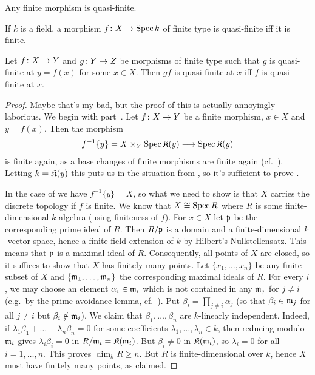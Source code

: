 \documentclass[a4paper,parskip=half,numbers=enddot, DIV=12]{scrreprt}
\renewcommand{\geq}{\geqslant}
\begin{document}
\begin{fact}
	\begin{alphanumerate}
		\item {}Any finite morphism is quasi-finite.
		\item If $k$ is a field, a morphism $f\colon X\morphism\Spec k$ of finite type is quasi-finite iff it is finite.
		\item Let $f\colon X\morphism Y$ and $g\colon Y\morphism Z$ be morphisms of finite type such that $g$ is quasi-finite at $y=f(x)$ for some $x\in X$. Then $gf$ is quasi-finite at $x$ iff $f$ is quasi-finite at $x$.
	\end{alphanumerate}
\end{fact}
\begin{proof}
	Maybe that's my bad, but the proof of this is actually annoyingly laborious. We begin with part~. Let $f\colon X\morphism Y$ be a finite morphism, $x\in X$ and $y=f(x)$. Then the morphism
	\begin{align*}
		f^{-1}\{y\}=X\times_Y\Spec \KK(y)\morphism \Spec \KK(y)
	\end{align*}
	is finite again, as a base changes of finite morphisms are finite again (cf.\ \cite[Corollary~1.5.1]{alggeo1}). Letting $k=\mathfrak{K}(y)$ this puts us in the situation from , so it's sufficient to prove .
	
	In the case of  we have $f^{-1}\{y\}=X$, so what we need to show is that $X$ carries the discrete topology if $f$ is finite. We know that $X\cong \operatorname{Spec} R$ where $R$ is some finite-dimensional $k$-algebra (using finiteness of $f$). For $x\in X$ let $\mathfrak{p}$ be the corresponding prime ideal of $R$. Then $R/\mathfrak{p}$ is a domain and a finite-dimensional $k$-vector space, hence a finite field extension of $k$ by Hilbert's Nullstellensatz. This means that $\mathfrak{p}$ is a maximal ideal of $R$. Consequently, all points of $X$ are closed, so it suffices to show that $X$ has finitely many points. Let $\{x_1,\ldots,x_n\}$ be any finite subset of $X$ and $\{\mathfrak{m}_1,\ldots,\mathfrak{m}_n\}$ the corresponding maximal ideals of $R$. For every $i$, we may choose an element $\alpha_i\in\mathfrak{m}_i$ which is not contained in any $\mathfrak{m}_j$ for $j\neq i$ (e.g.\ by the prime avoidance lemma, cf.\ \cite[Lemma~2.5.1]{alg1}). Put $\beta_i=\prod_{j\neq i}\alpha_j$ (so that $\beta_i\in\mathfrak{m}_j$ for all $j\neq i$ but $\beta_i\notin \mathfrak{m}_i$). We claim that $\beta_1,\ldots,\beta_n$ are $k$-linearly independent. Indeed, if $\lambda_1\beta_1+\ldots+\lambda_n\beta_n=0$ for some coefficients $\lambda_1,\ldots,\lambda_n\in k$, then reducing modulo $\mathfrak{m}_i$ gives $\lambda_i\beta_i=0$ in $R/\mathfrak{m}_i=\mathfrak{K}(\mathfrak{m}_i)$. But $\beta_i\neq 0$ in $\mathfrak{K}(\mathfrak{m}_i)$, so $\lambda_i=0$ for all $i=1,\ldots,n$. This proves $\dim_kR\geq n$. But $R$ is finite-dimensional over $k$, hence $X$ must have finitely many points, as claimed.
	

\end{proof}
\end{document}

